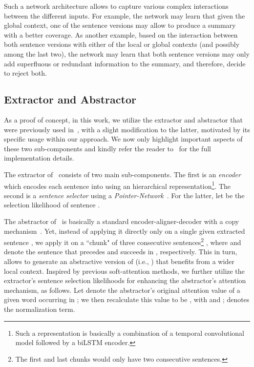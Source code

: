 \documentclass{article}
\begin{document}
Such a network architecture allows to capture various complex interactions between the different inputs. 
For example, the network may learn that given the global context, one of the sentence versions may allow to produce a summary with a better coverage. As another example, based on the interaction between both sentence versions with either of the local or global contexts (and possibly among the last two), the network may learn that both sentence versions may only add superfluous or redundant information to the summary, and therefore, decide to reject both.

\subsection{Extractor and Abstractor}\label{sec:EA sum}
As a proof of concept, in this work, we utilize the extractor and abstractor that were previously used in~\cite{ChenFastAS2018}, with a slight modification to the latter, motivated by its specific usage within our approach. 
We now only highlight important aspects of these two sub-components and kindly refer the reader to~\cite{ChenFastAS2018} for the full implementation details.

The extractor of~\cite{ChenFastAS2018} consists of two main sub-components. The first is an \textit{encoder} which encodes each sentence  into  using an hierarchical representation\footnote{\small Such a representation is basically a combination of a temporal convolutional model followed by a biLSTM encoder.}. The second is a \textit{sentence selector} using a \textit{Pointer-Network}~\cite{vinyals2015pointer}. For the latter, let  be the selection likelihood of sentence .

The abstractor of~\cite{ChenFastAS2018} is basically a standard encoder-aligner-decoder with a copy mechanism~\cite{See2017GetTT}. Yet, instead of applying it directly only on a single given extracted sentence , we apply it on a ``chunk" of three consecutive sentences\footnote{\small The first and last chunks would only have two consecutive sentences.}  , where  and  denote the sentence that precedes and succeeds  in , respectively. This in turn, allows to generate an abstractive version of  (i.e., ) that benefits from a wider local context. Inspired by previous soft-attention methods, we further utilize the extractor's sentence selection likelihoods  for enhancing the abstractor's attention mechanism, as follows. Let  denote the abstractor's original attention value of a given word  occurring in ; we then recalculate this value to be , with  and ;  denotes the normalization term.
\end{document}
